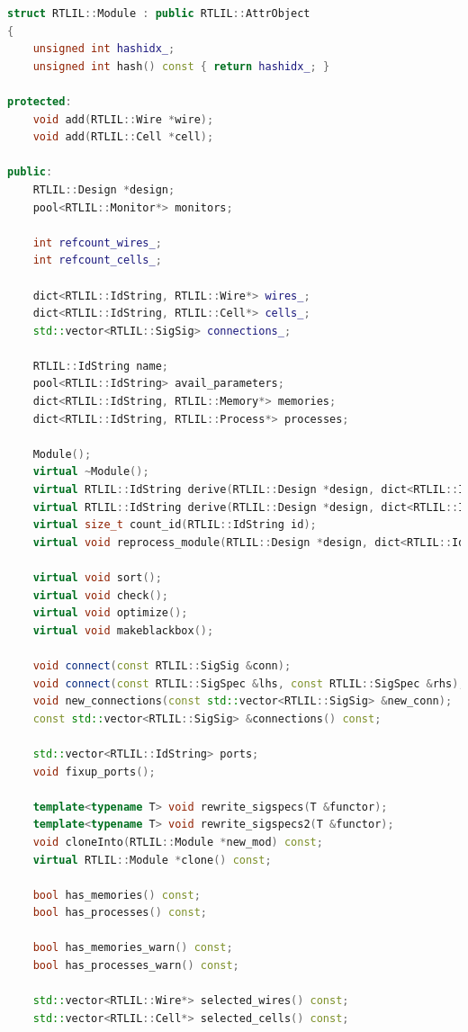 \documentclass[11pt]{report}
\begin{document}
\begin{lstlisting}[language=C++]
struct RTLIL::Module : public RTLIL::AttrObject
{
	unsigned int hashidx_;
	unsigned int hash() const { return hashidx_; }

protected:
	void add(RTLIL::Wire *wire);
	void add(RTLIL::Cell *cell);

public:
	RTLIL::Design *design;
	pool<RTLIL::Monitor*> monitors;

	int refcount_wires_;
	int refcount_cells_;

	dict<RTLIL::IdString, RTLIL::Wire*> wires_;
	dict<RTLIL::IdString, RTLIL::Cell*> cells_;
	std::vector<RTLIL::SigSig> connections_;

	RTLIL::IdString name;
	pool<RTLIL::IdString> avail_parameters;
	dict<RTLIL::IdString, RTLIL::Memory*> memories;
	dict<RTLIL::IdString, RTLIL::Process*> processes;

	Module();
	virtual ~Module();
	virtual RTLIL::IdString derive(RTLIL::Design *design, dict<RTLIL::IdString, RTLIL::Const> parameters, bool mayfail = false);
	virtual RTLIL::IdString derive(RTLIL::Design *design, dict<RTLIL::IdString, RTLIL::Const> parameters, dict<RTLIL::IdString, RTLIL::Module*> interfaces, dict<RTLIL::IdString, RTLIL::IdString> modports, bool mayfail = false);
	virtual size_t count_id(RTLIL::IdString id);
	virtual void reprocess_module(RTLIL::Design *design, dict<RTLIL::IdString, RTLIL::Module *> local_interfaces);

	virtual void sort();
	virtual void check();
	virtual void optimize();
	virtual void makeblackbox();

	void connect(const RTLIL::SigSig &conn);
	void connect(const RTLIL::SigSpec &lhs, const RTLIL::SigSpec &rhs);
	void new_connections(const std::vector<RTLIL::SigSig> &new_conn);
	const std::vector<RTLIL::SigSig> &connections() const;

	std::vector<RTLIL::IdString> ports;
	void fixup_ports();

	template<typename T> void rewrite_sigspecs(T &functor);
	template<typename T> void rewrite_sigspecs2(T &functor);
	void cloneInto(RTLIL::Module *new_mod) const;
	virtual RTLIL::Module *clone() const;

	bool has_memories() const;
	bool has_processes() const;

	bool has_memories_warn() const;
	bool has_processes_warn() const;

	std::vector<RTLIL::Wire*> selected_wires() const;
	std::vector<RTLIL::Cell*> selected_cells() const;


\end{lstlisting}
\end{document}
